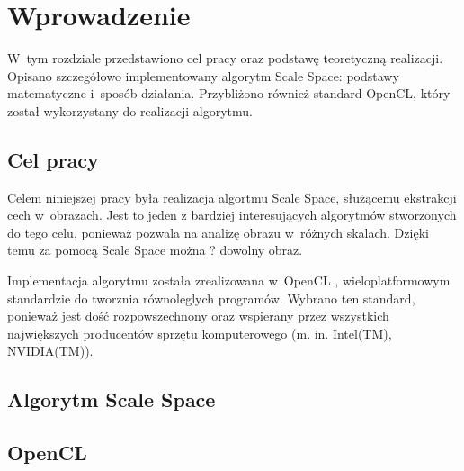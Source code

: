 \chapter{Wprowadzenie}
\label{cha:wprowadzenie}

W~tym rozdziale przedstawiono cel pracy oraz podstawę teoretyczną realizacji. Opisano szczegółowo implementowany algorytm Scale Space: podstawy matematyczne i~sposób działania. Przybliżono również standard OpenCL, który został wykorzystany do realizacji algorytmu.


\section{Cel pracy}
\label{sec:cel}
Celem niniejszej pracy była realizacja algortmu Scale Space, służącemu ekstrakcji cech w~obrazach. Jest to jeden z bardziej interesujących algorytmów stworzonych do tego celu, ponieważ pozwala na analizę obrazu w~różnych skalach. Dzięki temu za pomocą Scale Space można ? dowolny obraz.

Implementacja algorytmu została zrealizowana w~OpenCL \cite{OpenCL}, wieloplatformowym standardzie do tworznia równoleglych programów. Wybrano ten standard, ponieważ jest dość rozpowszechnony oraz wspierany przez wszystkich największych producentów sprzętu komputerowego (m. in. Intel(TM), NVIDIA(TM)).

\section{Algorytm Scale Space}
\label{sec:algorytm}

\section{OpenCL}
\label{sec:OpenCL}
